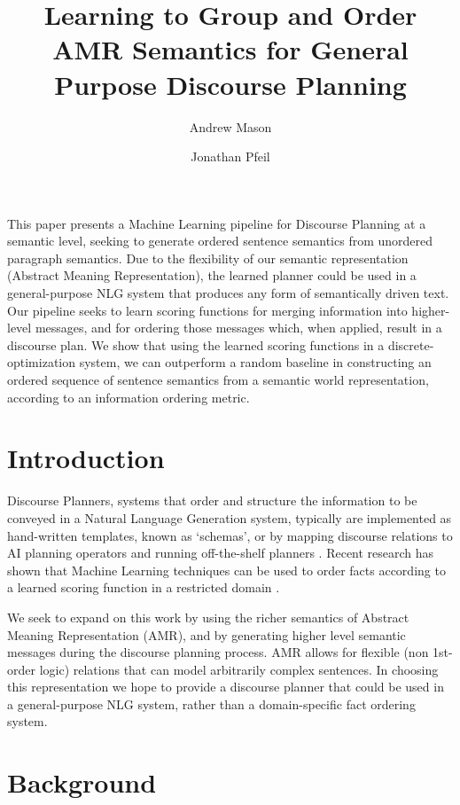 \documentclass[12pt]{article}
\title{Learning to Group and Order AMR Semantics for General Purpose Discourse Planning}
\author{Andrew Mason \and Jonathan Pfeil}
\begin{document}
\maketitle
\tableofcontents
\listoffigures
\listofalgorithms
\listoftables

\abstract
This paper presents a Machine Learning pipeline for Discourse Planning at a semantic level, seeking to generate ordered sentence semantics from unordered paragraph semantics. Due to the flexibility of our semantic representation (Abstract Meaning Representation), the learned planner could be used in a general-purpose NLG system that produces any form of semantically driven text. Our pipeline seeks to learn scoring functions for merging information into higher-level messages, and for ordering those messages which, when applied, result in a discourse plan. We show that using the learned scoring functions in a discrete-optimization system, we can outperform a random baseline in constructing an ordered sequence of sentence semantics from a semantic world representation, according to an information ordering metric.

\pagebreak

\section{Introduction}
Discourse Planners, systems that order and structure the information to be conveyed in a Natural Language Generation system, typically are implemented as hand-written templates, known as `schemas', or by mapping discourse relations to AI planning operators and running off-the-shelf planners \cite{applied_nlg}. Recent research has shown that Machine Learning techniques can be used to order facts according to a learned scoring function in a restricted domain \cite{learning_to_order_facts}. 

We seek to expand on this work by using the richer semantics of Abstract Meaning Representation (AMR), and by generating higher level semantic messages during the discourse planning process. AMR allows for flexible (non 1st-order logic) relations that can model arbitrarily complex sentences. In choosing this representation we hope to provide a discourse planner that could be used in a general-purpose NLG system, rather than a domain-specific fact ordering system.

\section{Background}
\end{document}

